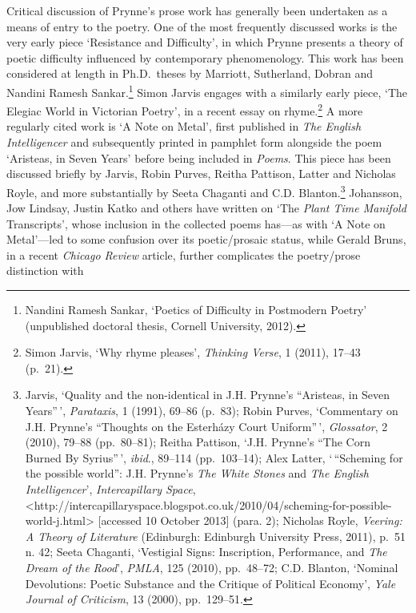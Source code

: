 \documentclass[]{article}
\begin{document}
Critical discussion of Prynne's prose work has generally been undertaken
as a means of entry to the poetry. One of the most frequently discussed
works is the very early piece `Resistance and Difficulty', in which
Prynne presents a theory of poetic difficulty influenced by contemporary
phenomenology. This work has been considered at length in Ph.D.~theses
by Marriott, Sutherland, Dobran and Nandini Ramesh Sankar.\footnote{Nandini
  Ramesh Sankar, `Poetics of Difficulty in Postmodern Poetry'
  (unpublished doctoral thesis, Cornell University, 2012).} Simon Jarvis
engages with a similarly early piece, `The Elegiac World in Victorian
Poetry', in a recent essay on rhyme.\footnote{Simon Jarvis, `Why rhyme
  pleases', \emph{Thinking Verse}, 1 (2011), 17--43 (p.~21).} A more
regularly cited work is `A Note on Metal', first published in \emph{The
English Intelligencer} and subsequently printed in pamphlet form
alongside the poem `Aristeas, in Seven Years' before being included in
\emph{Poems}. This piece has been discussed briefly by Jarvis, Robin
Purves, Reitha Pattison, Latter and Nicholas Royle, and more
substantially by Seeta Chaganti and C.D. Blanton.\footnote{Jarvis,
  `Quality and the non-identical in J.H. Prynne's ``Aristeas, in Seven
  Years''\,', \emph{Parataxis}, 1 (1991), 69--86 (p.~83); Robin Purves,
  `Commentary on J.H. Prynne's ``Thoughts on the Esterházy Court
  Uniform''\,', \emph{Glossator}, 2 (2010), 79--88 (pp.~80--81); Reitha
  Pattison, `J.H. Prynne's ``The Corn Burned By Syrius''\,',
  \emph{ibid}., 89--114 (pp.~103--14); Alex Latter, `\,``Scheming for
  the possible world'': J.H. Prynne's \emph{The White Stones} and
  \emph{The English Intelligencer}', \emph{Intercapillary Space},
  \textless{}http://intercapillaryspace.blogspot.co.uk/2010/04/scheming-for-possible-world-j.html\textgreater{}
  {[}accessed 10 October 2013{]} (para. 2); Nicholas Royle,
  \emph{Veering: A Theory of Literature} (Edinburgh: Edinburgh
  University Press, 2011), p.~51 n. 42; Seeta Chaganti, `Vestigial
  Signs: Inscription, Performance, and \emph{The Dream of the Rood}',
  \emph{PMLA}, 125 (2010), pp.~48--72; C.D. Blanton, `Nominal
  Devolutions: Poetic Substance and the Critique of Political Economy',
  \emph{Yale Journal of Criticism}, 13 (2000), pp.~129--51.} Johansson,
Jow Lindsay, Justin Katko and others have written on `The \emph{Plant
Time Manifold} Transcripts', whose inclusion in the collected poems
has---as with `A Note on Metal'---led to some confusion over its
poetic/prosaic status, while Gerald Bruns, in a recent \emph{Chicago
Review} article, further complicates the poetry/prose distinction with
\end{document}

